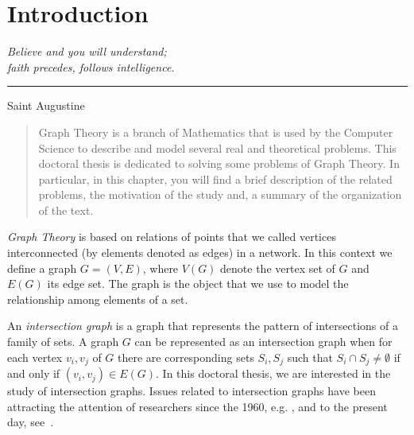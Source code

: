 \chapter{Introduction}

\begin{flushright}
\begin{minipage}[t][0cm][b]{0.47\textwidth}
\emph{%
Believe and you will understand; \\ faith precedes, follows intelligence.}
\end{minipage}

\rule[0cm]{7cm}{0.03cm}%

Saint Augustine 
\end{flushright}

\begin{quotation}
Graph Theory is a branch of Mathematics that is used by the Computer Science to describe and model several real and theoretical problems.  This doctoral thesis is dedicated to solving some problems of Graph Theory. In particular, in this chapter, you will find a brief description of the related problems, the motivation of the study and, a summary of the organization of the text.
\end{quotation}



\emph{Graph Theory} is based on relations of points that we called vertices interconnected (by elements denoted as edges) in a network. In this context we define a graph $G=(V,E)$, where $V(G)$ denote the vertex set of $G$ and $E(G)$ its edge set. The graph is the object that we use to model the relationship among  elements of a set.

An \emph{intersection graph} is a graph that represents the pattern of intersections of a family of sets. A graph $G$ can be represented as an intersection graph when for each vertex $v_i, v_j$ of $G$ there are corresponding sets $S_i, S_j$ such that $S_i \cap S_j \neq \emptyset $ if and only if $(v_i, v_j) \in E(G)$. In this doctoral thesis, we are interested in the study of intersection graphs. Issues related to intersection graphs have been attracting the attention of researchers since the 1960, e.g. \cite{erdos1966representation}, and to the present day, see~\cite{petito2002grafos,jose2018}.


